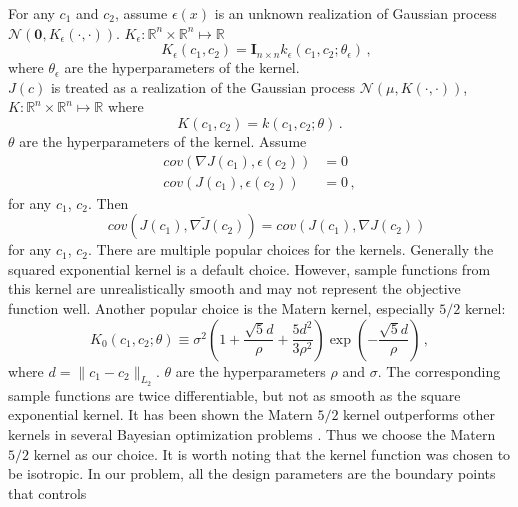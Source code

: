\documentclass[a4paper,onecolumn]{article}
\theoremstyle{remark}
\begin{document}
\noindent For any $c_1$ and $c_2$, assume
$\epsilon(x)$ is an unknown realization of Gaussian process
$\mathcal{N}(\textbf{0}, K_{\epsilon}(\cdot,\cdot))$. 
$K_\epsilon: \mathbb{R}^n \times\mathbb{R}^n\mapsto \mathbb{R}$
\begin{equation}
    \quad K_{\epsilon}(c_1, c_2) =\boldsymbol{I}_{n\times n} 
    k_\epsilon(c_1, c_2; \theta_\epsilon)\,,
\end{equation}
where $\theta_\epsilon$ are the hyperparameters of the kernel.\\
$J(c)$ is treated as a realization of the Gaussian process 
$\mathcal{N}(\mu, K(\cdot,\cdot))$, 
$K: \mathbb{R}^n \times\mathbb{R}^n\mapsto \mathbb{R}$
where
\begin{equation}
    K(c_1, c_2) = k(c_1, c_2; \theta)\,.
\end{equation}
$\theta$ are the hyperparameters of the kernel.
Assume
\begin{equation}\begin{split}
    cov(\nabla J(c_1), \epsilon(c_2)) &= 0\\
    cov(J(c_1), \epsilon(c_2)) &= 0\,,
\end{split}\end{equation}
for any $c_1$, $c_2$.
Then
\begin{equation}
    \quad cov(J(c_1), \nabla \tilde{J}(c_2)) = cov(J(c_1), \nabla J(c_2))
\end{equation}
for any $c_1$, $c_2$.
There are multiple popular choices for the kernels.
Generally the squared exponential kernel is a default choice. However,
sample functions from this kernel are unrealistically smooth and may not
represent the objective function well. Another popular choice is the Matern kernel, especially 
$5/2$ kernel:
\begin{equation}
    K_0(c_1, c_2; \theta) \equiv \sigma^2 \left(1+\frac{\sqrt{5}d}{\rho}
    + \frac{5d^2}{3\rho^2}\right) \exp\left(-\frac{\sqrt{5}d}{\rho}\right)\,,
    \label{funkernel}
\end{equation}
where $d = \|c_1-c_2\|_{L_2}$. $\theta$ are the hyperparameters $\rho$ and $\sigma$.
The corresponding sample functions are twice differentiable, but not as
smooth as the square exponential kernel. It has been shown the Matern $5/2$ kernel 
outperforms other kernels in several Bayesian optimization problems \cite{practicalBayesianopt}.
Thus we choose the Matern $5/2$ kernel as our choice.
It is worth noting that the kernel function was chosen to be isotropic. 
In our problem, all the design parameters are the boundary points that controls 
\end{document}
